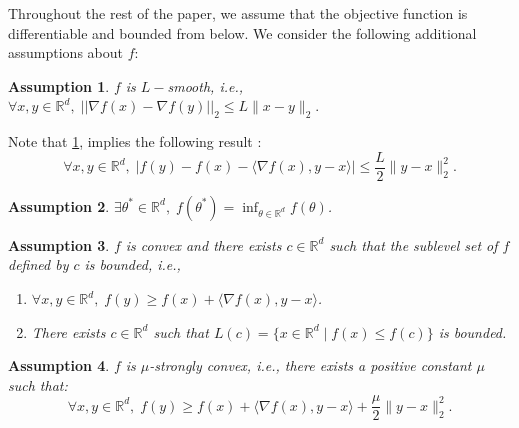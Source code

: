 \documentclass{article} %
\newtheorem{assumption}{Assumption}
\begin{document}
Throughout the rest of the paper, we assume that the objective function is differentiable and bounded from below. We consider the following additional assumptions about $f$:
\begin{assumption}\label{Ass1}
$f$ is $L-$smooth, i.e., 
$\forall x,y \in \mathbb{R}^d,\; || \nabla f(x)-\nabla f(y) ||_2 \le  L \lVert x-y \rVert_2.$
\end{assumption}

Note that \cref{Ass1}, implies the following result \cite[Lemma 1.2.3]{nesterov2013introductory}: 
\begin{equation}\label{ineq-smooth}
\forall x,y \in \mathbb{R}^d,\; |f(y) - f(x)- \langle \nabla f(x),y-x \rangle | \le \frac{L}{2} \lVert y-x\rVert_{2}^2.
\end{equation}
\begin{assumption}\label{Ass2}
 $\exists \theta^{*}  \in \mathbb{R}^d, \; f(\theta^{*})=\inf_{\theta \in \mathbb{R}^d } f(\theta)$.
\end{assumption}


\begin{assumption}\label{Ass3}
 $f$ is convex and there exists $ c \in \mathbb{R}^d$ such that the sublevel set of $f$ defined by $c$ is bounded, i.e.,
\begin{enumerate}
    \item $\forall x,y \in \mathbb{R}^d,\;  f(y) \ge f(x)+\langle \nabla f(x),y-x \rangle$.
    \item There exists $c \in \mathbb{R}^d$ such that $L( c)=\{x \in \mathbb{R}^d  \mid f(x) \leq f( c) \}$ is bounded.
\end{enumerate} 
\end{assumption}
\begin{assumption}\label{Ass4}
$f$ is $\mu$-strongly convex, i.e., 
there exists a positive constant $\mu$ such that: 
$$\forall x,y \in \mathbb{R}^d,\; f(y) \ge f(x)+ \langle \nabla f(x),y-x \rangle + \frac{\mu}{2} \lVert y-x\rVert_2^2.$$    
\end{assumption}
\end{document}
